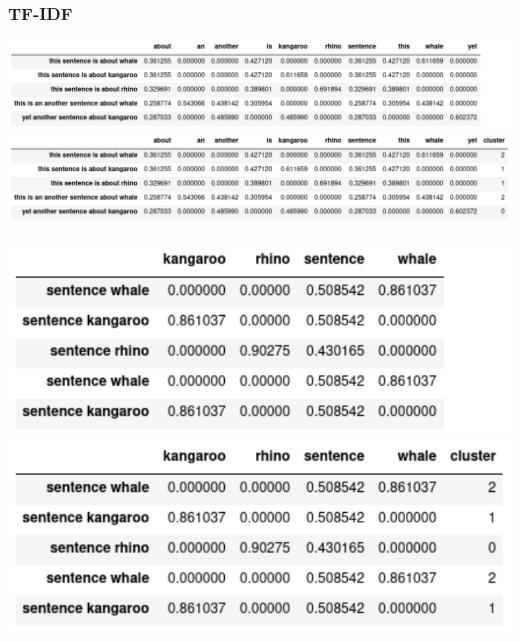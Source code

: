 \documentclass{beamer}
\begin{document}
\begin{frame}
\frametitle{TF-IDF}

  \vspace{20pt}
  \begin{overprint}
    \centering\includegraphics[width=\textwidth,height=\textheight,keepaspectratio]{figures/whale_vectorized.pdf}
    \centering\includegraphics[width=\textwidth,height=\textheight,keepaspectratio]{figures/whale_vectorized_clust.pdf}
  \end{overprint}
  \vspace{20pt}
  \begin{overprint}
    \centering\includegraphics[width=.5\textwidth,height=\textheight,keepaspectratio]{figures/whale_stopwords.pdf}
    \centering\includegraphics[width=.5\textwidth,height=\textheight,keepaspectratio]{figures/whale_stopwords_clust.pdf}
  \end{overprint}

\end{frame}
\end{document}
